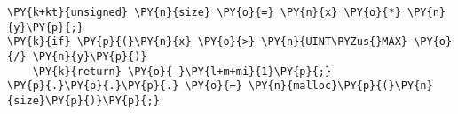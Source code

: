 \begin{Verbatim}[commandchars=\\\{\},codes={\catcode`\$=3\catcode`\^=7\catcode`\_=8}]
\PY{k+kt}{unsigned} \PY{n}{size} \PY{o}{=} \PY{n}{x} \PY{o}{*} \PY{n}{y}\PY{p}{;}
\PY{k}{if} \PY{p}{(}\PY{n}{x} \PY{o}{>} \PY{n}{UINT\PYZus{}MAX} \PY{o}{/} \PY{n}{y}\PY{p}{)}
    \PY{k}{return} \PY{o}{-}\PY{l+m+mi}{1}\PY{p}{;}
\PY{p}{.}\PY{p}{.}\PY{p}{.} \PY{o}{=} \PY{n}{malloc}\PY{p}{(}\PY{n}{size}\PY{p}{)}\PY{p}{;}
\end{Verbatim}
